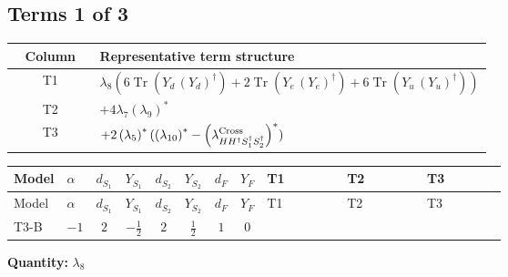 \documentclass[8pt]{article}
\begin{document}
\begin{landscape}
\subsection*{Terms 1 of 3}
\begin{center}
\begin{tabular}{@{}c >{\raggedright\arraybackslash}p{0.82\linewidth}@{}}
\toprule
Column & Representative term structure \\
\midrule
T1 & \(\displaystyle {\lambda_{8}} (6 \operatorname{Tr}\!\left({Y_d}\,\left({Y_d}\right)^{\dagger}\right)+2 \operatorname{Tr}\!\left({Y_e}\,\left({Y_e}\right)^{\dagger}\right)+6 \operatorname{Tr}\!\left({Y_u}\,\left({Y_u}\right)^{\dagger}\right))\) \\
\midrule
T2 & \(\displaystyle +4 {\lambda_{7}} \left({\lambda_{9}}\right)^{*}\) \\
\midrule
T3 & \(\displaystyle +2 \left({\lambda_5}\right)^{*} (\left({\lambda_{10}}\right)^{*}-\left({\lambda_{H H^\dagger S_1^\dagger S_2^\dagger}^{\rm Cross}}\right)^{*})\) \\
\midrule
\bottomrule
\end{tabular}
\end{center}
\smallskip
\tiny
\begin{longtable}{@{}llcccccc >{\raggedright\arraybackslash}p{0.21\linewidth} >{\raggedright\arraybackslash}p{0.21\linewidth} >{\raggedright\arraybackslash}p{0.21\linewidth}@{}}
\toprule
Model & $\alpha$ & $d_{S_1}$ & $Y_{S_1}$ & $d_{S_2}$ & $Y_{S_2}$ & $d_F$ & $Y_F$ & T1 & T2 & T3 \\
\midrule
\endfirsthead
\toprule
Model & $\alpha$ & $d_{S_1}$ & $Y_{S_1}$ & $d_{S_2}$ & $Y_{S_2}$ & $d_F$ & $Y_F$ & T1 & T2 & T3 \\
\midrule
\endhead
T3-B & $-1$ & $2$ & $-\frac{1}{2}$ & $2$ & $\frac{1}{2}$ & $1$ & $0$ & \scriptsize\adjustbox{max width=\linewidth}{$\begin{gathered} {\lambda_{8}} (6 \operatorname{Tr}\!\left({Y_d}\,\left({Y_d}\right)^{\dagger}\right)+2 \operatorname{Tr}\!\left({Y_e}\,\left({Y_e}\right)^{\dagger}\right)+6 \operatorname{Tr}\!\left({Y_u}\,\left({Y_u}\right)^{\dagger}\right))\end{gathered}$} & \scriptsize\adjustbox{max width=\linewidth}{$\begin{gathered} +4 {\lambda_{7}} \left({\lambda_{9}}\right)^{*}\end{gathered}$} & \scriptsize\adjustbox{max width=\linewidth}{$\begin{gathered} +2 \left({\lambda_5}\right)^{*} (\left({\lambda_{10}}\right)^{*}-\left({\lambda_{H H^\dagger S_1^\dagger S_2^\dagger}^{\rm Cross}}\right)^{*})\end{gathered}$} \\
\midrule
\bottomrule
\end{longtable}
\clearpage
\noindent\textbf{Quantity: }$\lambda_{8}$\par\smallskip

\end{landscape}
\end{document}

